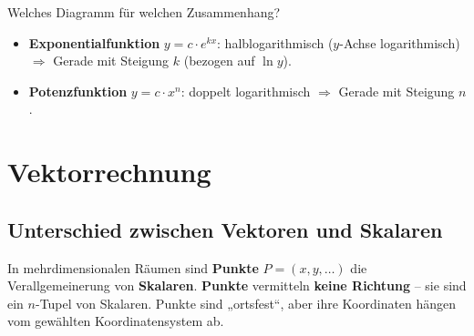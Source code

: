 \begin{rememberbox}[]{Welches Diagramm für welchen Zusammenhang?}
    \begin{itemize}[itemsep=1.5pt]
        \item \textbf{Exponentialfunktion} $y = c \cdot e^{kx}$: halblogarithmisch ($y$-Achse logarithmisch) $\Rightarrow$ Gerade mit Steigung $k$ (bezogen auf $\ln y$).
        \item \textbf{Potenzfunktion} $y = c \cdot x^n$: doppelt logarithmisch $\Rightarrow$ Gerade mit Steigung $n$.
    \end{itemize}
\end{rememberbox}

\newpage
\chapter{Vektorrechnung}\label{chapter: Vektorrechnung}
\section{Unterschied zwischen Vektoren und Skalaren}\label{sec: Vektor_vs_Skalar}
In mehrdimensionalen Räumen sind \textbf{Punkte} $P = (x,y,\ldots)$ die Verallgemeinerung von \textbf{Skalaren}. \textbf{Punkte} vermitteln \textbf{keine Richtung} -- sie sind ein $n$-Tupel von Skalaren. Punkte sind „ortsfest“, aber ihre Koordinaten hängen vom gewählten Koordinatensystem ab.

